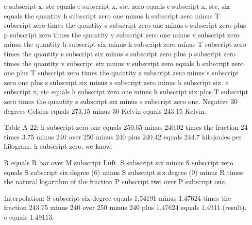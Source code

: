 e subscript x, stc equals e subscript x, stc, zero equals e subscript x, stc, six equals the quantity h subscript zero one minus h subscript zero minus T subscript zero times the quantity s subscript zero one minus s subscript zero plus p subscript zero times the quantity v subscript zero one minus v subscript zero minus the quantity h subscript six minus h subscript zero minus T subscript zero times the quantity s subscript six minus s subscript zero plus p subscript zero times the quantity v subscript six minus v subscript zero equals h subscript zero one plus T subscript zero times the quantity s subscript zero minus s subscript zero one plus s subscript six minus s subscript zero minus h subscript six. e subscript x, stc equals h subscript zero one minus h subscript six plus T subscript zero times the quantity s subscript six minus s subscript zero one. Negative 30 degrees Celsius equals 273.15 minus 30 Kelvin equals 243.15 Kelvin.

Table A-22:
h subscript zero one equals 250.65 minus 240.02 times the fraction 24 times 3.75 minus 240 over 250 minus 240 plus 240.42 equals 244.7 kilojoules per kilogram. h subscript zero, we know.

R equals R bar over M subscript Luft. S subscript six minus S subscript zero equals S subscript six degree (6) minus S subscript six degree (0) minus R times the natural logarithm of the fraction P subscript two over P subscript one.

Interpolation:
S subscript six degree equals 1.54191 minus 1.47624 times the fraction 243.75 minus 240 over 250 minus 240 plus 1.47624 equals 1.4911 (result). c equals 1.49113.